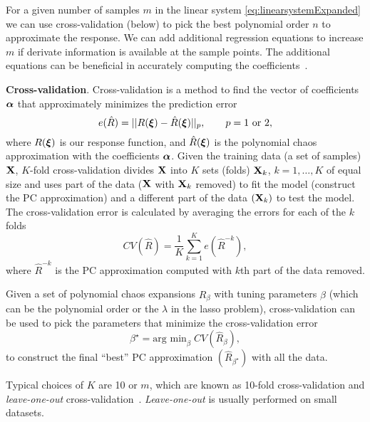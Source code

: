 For a given number of samples $m$ in the linear system \cref{eq:linearsystemExpanded} we can use cross-validation (below) to pick the best polynomial order $n$ to approximate the response.  We can add additional regression equations to increase $m$ if derivate information is available at the sample points. The additional equations can be beneficial in accurately computing the coefficients~\cite{Jakeman2015,Peng2016}.

\textbf{Cross-validation}.
Cross-validation is a method to find the vector of coefficients $\boldsymbol{\alpha}$ that approximately minimizes the prediction error
\begin{equation}
  e(\hat{R}) = ||R(\boldsymbol{\xi}) - \hat{R}(\boldsymbol{\xi})||_p, \qquad p={1 \text{ or } 2},
\end{equation}
where $R(\boldsymbol{\xi})$ is our response function, and $\hat{R}(\boldsymbol{\xi})$ is the polynomial chaos approximation with the coefficients $\boldsymbol{\alpha}$.
Given the training data (a set of samples) $\mathbf{X}$, $K$-fold cross-validation divides $\mathbf{X}$ into $K$ sets (folds) $\mathbf{X}_k$, $k=1,\dots,K$ of equal size and uses part of the data ($\mathbf{X}$ with $\mathbf{X}_k$ removed) to fit the model (construct the PC approximation) and a different part of the data $(\mathbf{X}_k)$ to test the model. The cross-validation error is calculated by averaging the errors for each of the $k$ folds
\begin{equation}
  CV(\hat{R}) = \frac{1}{K} \sum_{k=1}^K e(\hat{R}^{-k}),
\end{equation}
where $\hat{R}^{-k}$ is the PC approximation computed with $k$th part of the data removed.

Given a set of polynomial chaos expansions $\hat{R}_\beta$ with tuning parameters $\beta$ (which can be the polynomial order or the $\lambda$ in the lasso problem), cross-validation can be used to pick the parameters that minimize the cross-validation error
\begin{equation}
  \beta^\star = \text{arg min}_\beta \; CV(\hat{R}_\beta),
\end{equation}
to construct the final ``best'' PC approximation $(\hat{R}_{\beta^\star})$ with all the data.

Typical choices of $K$ are 10 or $m$, which are known as 10-fold cross-validation and \textit{leave-one-out} cross-validation~\cite{Hastie2009}. \textit{Leave-one-out} is usually performed on small datasets.


